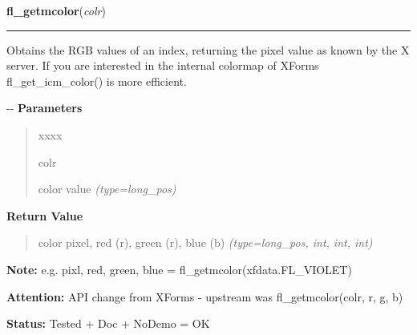 \hspace{.8\funcindent}\begin{boxedminipage}{\funcwidth}

    \raggedright \textbf{fl\_getmcolor}(\textit{colr})

    \vspace{-1.5ex}

    \rule{\textwidth}{0.5\fboxrule}
\setlength{\parskip}{2ex}

Obtains the RGB values of an index, returning the pixel value as known
by the X server. If you are interested in the internal colormap of XForms
fl\_get\_icm\_color() is more efficient.

-{}-
\setlength{\parskip}{1ex}
      \textbf{Parameters}
      \vspace{-1ex}

      \begin{quote}
        \begin{Ventry}{xxxx}

          \item[colr]


color value
            {\it (type=long\_pos)}

        \end{Ventry}

      \end{quote}

      \textbf{Return Value}
    \vspace{-1ex}

      \begin{quote}

color pixel, red (r), green (r), blue (b)
      {\it (type=long\_pos, int, int, int)}

      \end{quote}

\textbf{Note:} 
e.g. pixl, red, green, blue = fl\_getmcolor(xfdata.FL\_VIOLET)


\textbf{Attention:} 
API change from XForms - upstream was
fl\_getmcolor(colr, r, g, b)


\textbf{Status:} 
Tested + Doc + NoDemo = OK


    \end{boxedminipage}

    \label{xformslib:flbasic:fl_get_pixel}

    \vspace{0.5ex}

